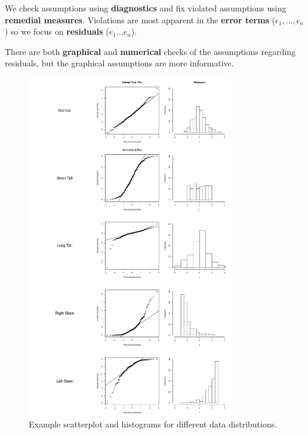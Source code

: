 \documentclass[12pt]{notes}
\begin{document}
We check assumptions using \textbf{diagnostics} and fix violated assumptions using \textbf{remedial measures}. Violations are most apparent in the \textbf{error terms} ($\epsilon_1, \ldots, \epsilon_n$) so we focus on \textbf{residuals} ($e_1 \ldots e_n$). 

\nspace
There are both \textbf{graphical} and \textbf{numerical} checks of the assumptions regarding residuals, but the graphical assumptions are more informative. 

\begin{figure}[H]
\includegraphics[width = 0.8\textwidth]{figures/module2/distTable.pdf}
\caption{Example scatterplot and histograms for different data distributions.}
\end{figure}
\end{document}
